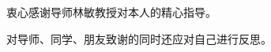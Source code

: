 \begin{acknowledgement}
    衷心感谢导师林敏教授对本人的精心指导。

    对导师、同学、朋友致谢的同时还应对自己进行反思。
\end{acknowledgement}
